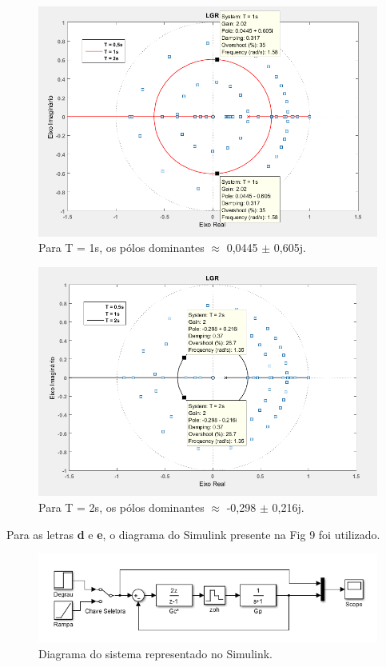 \documentclass{article}
\begin{document}
    \begin{figure}[H]
       \centering
            \includegraphics[width=.9\linewidth]{images/LGR_PoloDom1.png}
            \caption{Para T = 1s, os pólos dominantes $\approx$ 0,0445 $\pm$ 0,605j.}
            \label{fig:poloDom1}
    \end{figure}

    \begin{figure}[H]
       \centering
            \includegraphics[width=1\linewidth]{images/LGR_PoloDom2.png}
            \caption{Para T = 2s, os pólos dominantes $\approx$ -0,298 $\pm$ 0,216j.}
            \label{fig:poloDom2}
    \end{figure}


    \vspace{7mm}
    {Para as letras \textbf{d} e \textbf{e}, o diagrama do Simulink presente na Fig 9 foi utilizado.}

    \begin{figure}[H]
       \centering
            \includegraphics[width=1\linewidth]{images/DiagramaSimulink.png}
            \caption{Diagrama do sistema representado no Simulink.}
            \label{fig:diagSim}
    \end{figure}
\end{document}
